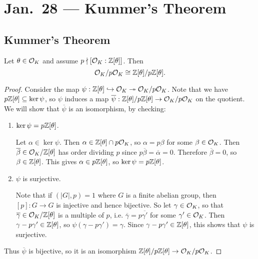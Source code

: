 \chapter{Jan.~28 --- Kummer's Theorem}

\section{Kummer's Theorem}

\begin{lemma}
  Let $\theta \in \mathcal{O}_K$ and assume
  $p \nmid [\mathcal{O}_K : \mathbb{Z}[\theta]]$. Then
  \[
    \mathcal{O}_K / p \mathcal{O}_K \cong \mathbb{Z}[\theta] / p \mathbb{Z}[\theta].
  \]
\end{lemma}

\begin{proof}
  Consider the map $\psi: \mathbb{Z}[\theta] \hookrightarrow \mathcal{O}_K \twoheadrightarrow \mathcal{O}_K / p \mathcal{O}_K$.
  Note that we have $p\mathbb{Z}[\theta] \subseteq \ker \psi$,
  so $\psi$ induces a map $\overline{\psi}: \mathbb{Z}[\theta] / p \mathbb{Z}[\theta] \to \mathcal{O}_K / p \mathcal{O}_K$
  on the quotient. We will show that
  $\overline{\psi}$ is an isomorphism, by checking:
  \begin{enumerate}
    \item $\ker \psi = p \mathbb{Z}[\theta]$.

  Let $\alpha \in \ker \psi$.
  Then $\alpha \in \mathbb{Z}[\theta] \cap p \mathcal{O}_K$, so
  $\alpha = p \beta$ for some $\beta \in \mathcal{O}_K$.
  Then $\overline{\beta} \in \mathcal{O}_K / \mathbb{Z}[\theta]$
  has order dividing $p$ since $p \overline{\beta} = \overline{\alpha} = 0$.
  Therefore $\overline{\beta} = 0$, so
  $\beta \in \mathbb{Z}[\theta]$. This gives $\alpha \in p\mathbb{Z}[\theta]$, so
  $\ker \psi = p \mathbb{Z}[\theta]$.

  \item $\psi$ is surjective.

  Note that if $(|G|, p) = 1$ where $G$ is a
  finite abelian group, then $[p] : G \to G$ is injective
  and hence bijective. So let $\gamma \in \mathcal{O}_K$,
  so that $\overline{\gamma} \in \mathcal{O}_K / \mathbb{Z}[\theta]$ is
  a multiple of $p$, i.e. $\overline{\gamma} = p \overline{\gamma'}$ for some $\gamma' \in \mathcal{O}_K$.
  Then $\gamma - p \gamma' \in \mathbb{Z}[\theta]$,
  so $\psi(\gamma - p\gamma') = \gamma$.
  Since $\gamma - p \gamma' \in \mathbb{Z}[\theta]$, this
  shows that $\psi$ is surjective.
  \end{enumerate}

  Thus $\overline{\psi}$ is bijective, so it
  is an isomorphism $\mathbb{Z}[\theta] / p \mathbb{Z}[\theta] \to \mathcal{O}_K / p \mathcal{O}_K$.
\end{proof}

